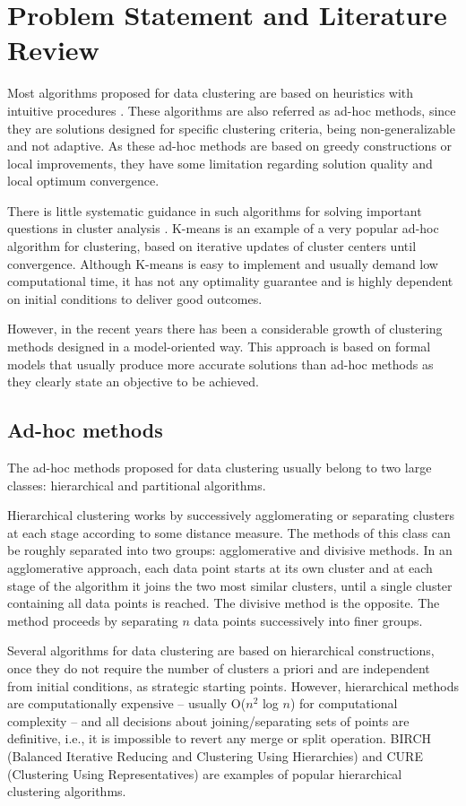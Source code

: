 \chapter{Problem Statement and Literature Review}

Most algorithms proposed for data clustering are based on heuristics with intuitive procedures \cite{Fraley2002}. These algorithms are also referred as ad-hoc methods, since they are solutions designed for specific clustering criteria, being non-generalizable and not adaptive. As these ad-hoc methods are based on greedy constructions or local improvements, they have some limitation regarding solution quality and local optimum convergence.

There is little systematic guidance in such algorithms for solving important questions in cluster analysis \cite{Fraley2002}. K-means is an example of a very popular ad-hoc algorithm for clustering, based on iterative updates of cluster centers until convergence. Although K-means is easy to implement and usually demand low computational time, it has not any optimality guarantee and is highly dependent on initial conditions to deliver good outcomes.

However, in the recent years there has been a considerable growth of clustering methods designed in a model-oriented way. This approach is based on formal models that usually produce more accurate solutions than ad-hoc methods as they clearly state an objective to be achieved.

\section{Ad-hoc methods}
The ad-hoc methods proposed for data clustering usually belong to two large classes: hierarchical and partitional algorithms.

Hierarchical clustering works by successively agglomerating or separating clusters at each stage according to some distance measure. The methods of this class can be roughly separated into two groups: agglomerative and divisive methods. In an agglomerative approach, each data point starts at its own cluster and at each stage of the algorithm it joins the two most similar clusters, until a single cluster containing all data points is reached. The divisive method is the opposite. The method proceeds by separating $n$ data points successively into finer groups. 

Several algorithms for data clustering are based on hierarchical constructions, once they do not require the number of clusters a priori and are independent from initial conditions, as strategic starting points. However, hierarchical methods are computationally expensive -- usually O($n^2$ log $n$) for computational complexity -- and all decisions about joining/separating sets of points are definitive, i.e., it is impossible to revert any merge or split operation. BIRCH (Balanced Iterative Reducing and Clustering Using Hierarchies) \cite{Zhang96} and CURE (Clustering Using Representatives) \cite{Guha1998} are examples of popular hierarchical clustering algorithms.
 

